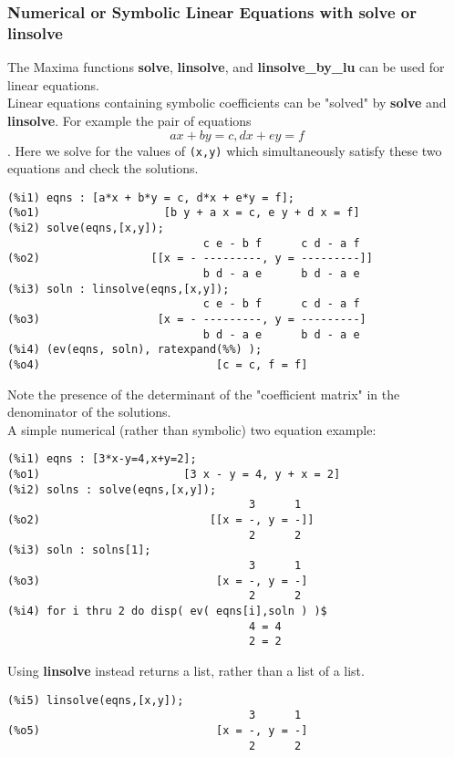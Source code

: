 \documentclass[12pt]{article}
\begin{document}
\subsubsection{Numerical or Symbolic Linear Equations with solve or linsolve  }
The Maxima functions \textbf{solve}, \textbf{linsolve}, and \textbf{linsolve\_by\_lu}
   can be used for linear equations.\\
   
Linear equations containing symbolic coefficients  can be
    "solved" by \textbf{solve} and \textbf{linsolve}.
For example the pair of equations
$$ a x + b y = c, d x + e y = f $$	.
Here we solve for the values of \verb|(x,y)| which simultaneously
  satisfy these two equations and check the solutions.
\small
\begin{verbatim}
(%i1) eqns : [a*x + b*y = c, d*x + e*y = f];
(%o1)                   [b y + a x = c, e y + d x = f]
(%i2) solve(eqns,[x,y]);
                              c e - b f      c d - a f
(%o2)                 [[x = - ---------, y = ---------]]
                              b d - a e      b d - a e
(%i3) soln : linsolve(eqns,[x,y]);
                              c e - b f      c d - a f
(%o3)                  [x = - ---------, y = ---------]
                              b d - a e      b d - a e
(%i4) (ev(eqns, soln), ratexpand(%%) );
(%o4)                           [c = c, f = f]
\end{verbatim}
\normalsize
Note the presence of the determinant of the "coefficient matrix" in the
  denominator of the solutions.\\
   
A simple numerical (rather than symbolic) two equation example:
\small
\begin{verbatim}
(%i1) eqns : [3*x-y=4,x+y=2];
(%o1)                      [3 x - y = 4, y + x = 2]
(%i2) solns : solve(eqns,[x,y]);
                                     3      1
(%o2)                          [[x = -, y = -]]
                                     2      2
(%i3) soln : solns[1];
                                     3      1
(%o3)                           [x = -, y = -]
                                     2      2
(%i4) for i thru 2 do disp( ev( eqns[i],soln ) )$
                                     4 = 4
                                     2 = 2
\end{verbatim}
\normalsize
Using \textbf{linsolve} instead returns a list, rather than a list of a list.
\small
\begin{verbatim}
(%i5) linsolve(eqns,[x,y]);
                                     3      1
(%o5)                           [x = -, y = -]
                                     2      2
\end{verbatim}
\normalsize
\end{document}
